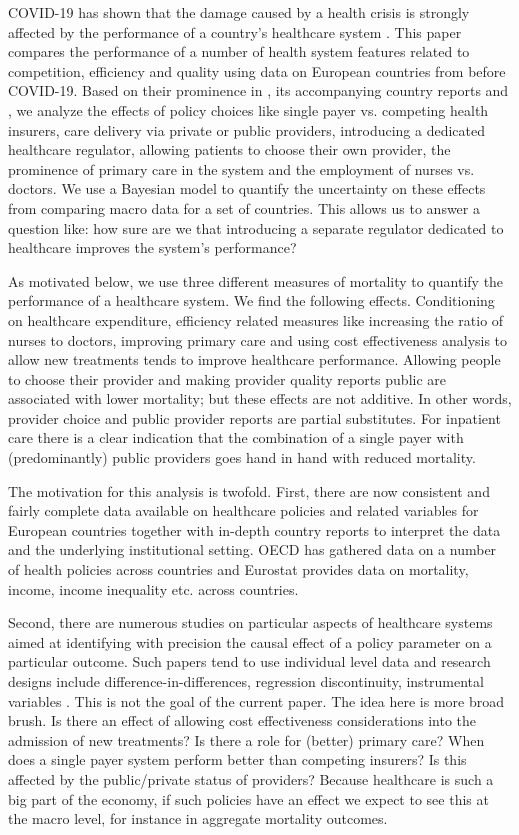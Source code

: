 \documentclass{article}
\begin{document}
COVID-19 has shown that the damage caused by a health crisis is strongly affected by the performance of a country's healthcare system \citep{OECD_2020}. This paper compares the performance of a number of health system features related to competition, efficiency and quality using data on European countries from before COVID-19. Based on their prominence in \cite{countryprofileReport}, its accompanying country reports and \citep{OECD_2020}, we analyze the effects of policy choices like single payer vs. competing health insurers, care delivery via private or public providers, introducing a dedicated healthcare regulator, allowing patients to choose their own provider, the prominence of primary care in the system and the employment of nurses vs. doctors. We use a Bayesian model to quantify the uncertainty on these effects from comparing macro data for a set of countries. This allows us to answer a question like: how sure are we that introducing a separate regulator dedicated to healthcare improves the system's performance?

As motivated below, we use three different measures of mortality to quantify the performance of a healthcare system. We find the following effects. Conditioning on healthcare expenditure, efficiency related measures like increasing the ratio of nurses to doctors, improving primary care and using cost effectiveness analysis to allow new treatments tends to improve healthcare performance. Allowing people to choose their provider and making provider quality reports public are associated with lower mortality; but these effects are not additive. In other words, provider choice and public provider reports are partial substitutes. For inpatient care there is a clear indication that the combination of a single payer with (predominantly) public providers goes hand in hand with reduced mortality.

The motivation for this analysis is twofold. First, there are now consistent and fairly complete data available on healthcare policies and related variables for European countries together with in-depth country reports to interpret the data and the underlying institutional setting. OECD has gathered data on a number of health policies across countries and Eurostat provides data on mortality, income, income inequality etc. across countries.

Second, there are numerous studies on particular aspects of healthcare systems aimed at identifying with precision the causal effect of a policy parameter on a particular outcome. Such papers tend to use individual level data and research designs include difference-in-differences, regression discontinuity, instrumental variables \citep{econometricevaluation}. This is not the goal of the current paper. The idea here is more broad brush. Is there an effect of allowing cost effectiveness considerations into the admission of new treatments? Is there a role for (better) primary care? When does a single payer system perform better than competing insurers? Is this affected by the public/private status of providers? Because healthcare is such a big part of the economy, if such policies have an effect we expect to see this at the macro level, for instance in aggregate mortality outcomes. 
\end{document}
